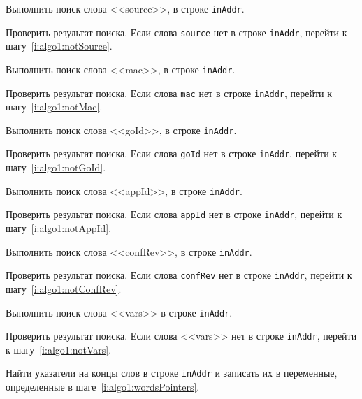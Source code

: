 \begin{enumerate_step}
    \item Выполнить поиск слова <<source>>, в
    строке \lstinline{inAddr}.
    \item Проверить результат поиска. Если слова \lstinline{source} нет в строке \lstinline{inAddr},
    перейти к шагу~\ref{i:algo1:notSource}.
    \item Выполнить поиск слова <<mac>>, в
    строке \lstinline{inAddr}.
    \item Проверить результат поиска. Если слова \lstinline{mac} нет в строке \lstinline{inAddr},
    перейти к шагу~\ref{i:algo1:notMac}.
    \item Выполнить поиск слова <<goId>>, в
    строке \lstinline{inAddr}.
    \item Проверить результат поиска. Если слова \lstinline{goId} нет в строке \lstinline{inAddr},
    перейти к шагу~\ref{i:algo1:notGoId}.
    \item Выполнить поиск слова <<appId>>, в
    строке \lstinline{inAddr}.
    \item Проверить результат поиска. Если слова \lstinline{appId} нет в строке \lstinline{inAddr},
    перейти к шагу~\ref{i:algo1:notAppId}.
    \item Выполнить поиск слова <<confRev>>, в
    строке \lstinline{inAddr}.
    \item Проверить результат поиска. Если слова \lstinline{confRev} нет в строке \lstinline{inAddr},
    перейти к шагу~\ref{i:algo1:notConfRev}.
    \item Выполнить поиск слова <<vars>> в
    строке \lstinline{inAddr}.
    \item Проверить результат поиска. Если слова <<vars>> нет в строке \lstinline{inAddr},
    перейти к шагу~\ref{i:algo1:notVars}.

    \item Найти указатели на концы слов в строке \lstinline{inAddr} и записать их в переменные, определенные в шаге~\ref{i:algo1:wordsPointers}.


\end{enumerate_step}
